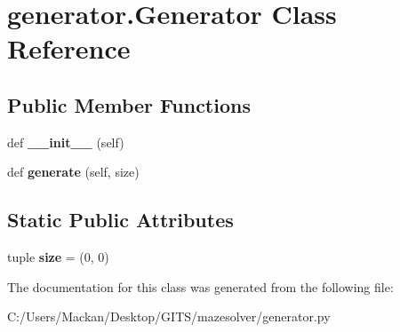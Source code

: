 \hypertarget{classgenerator_1_1_generator}{}\section{generator.\+Generator Class Reference}
\label{classgenerator_1_1_generator}
\subsection*{Public Member Functions}
\begin{DoxyCompactItemize}
\item 
\mbox{\label{classgenerator_1_1_generator_abd19801de7e8fbe60f931aa354a2e21a}} 
def {\bfseries \+\_\+\+\_\+init\+\_\+\+\_\+} (self)
\item 
\mbox{\label{classgenerator_1_1_generator_ae1c071191eeb087152e1062edf722d04}} 
def {\bfseries generate} (self, size)
\end{DoxyCompactItemize}
\subsection*{Static Public Attributes}
\begin{DoxyCompactItemize}
\item 
\mbox{\label{classgenerator_1_1_generator_a3897ea7b079e3e4c217d28fbb3847f66}} 
tuple {\bfseries size} = (0, 0)
\end{DoxyCompactItemize}


The documentation for this class was generated from the following file\+:\begin{DoxyCompactItemize}
\item 
C\+:/\+Users/\+Mackan/\+Desktop/\+G\+I\+T\+S/mazesolver/generator.\+py\end{DoxyCompactItemize}
